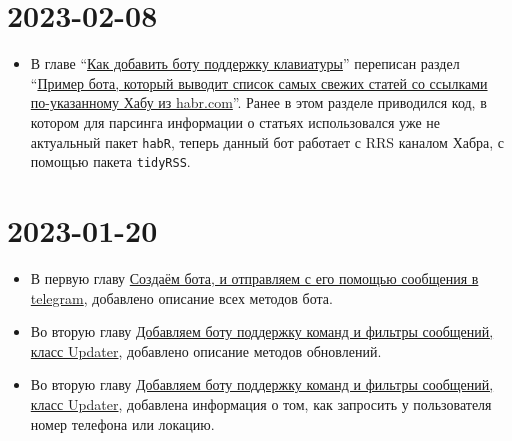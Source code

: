 \documentclass[
]{book}
\providecommand{\tightlist}{%
  \setlength{\itemsep}{0pt}\setlength{\parskip}{0pt}}
\begin{document}
\section*{2023-02-08}\label{section-3}

\begin{itemize}
\tightlist
\item
  В главе ``\hyperref[ux43aux430ux43a-ux434ux43eux431ux430ux432ux438ux442ux44c-ux431ux43eux442ux443-ux43fux43eux434ux434ux435ux440ux436ux43aux443-ux43aux43bux430ux432ux438ux430ux442ux443ux440ux44b]{Как добавить боту поддержку клавиатуры}'' переписан раздел ``\hyperref[ux43fux440ux438ux43cux435ux440-ux431ux43eux442ux430-ux43aux43eux442ux43eux440ux44bux439-ux432ux44bux432ux43eux434ux438ux442-ux441ux43fux438ux441ux43eux43a-ux441ux430ux43cux44bux445-ux441ux432ux435ux436ux438ux445-ux441ux442ux430ux442ux435ux439-ux441ux43e-ux441ux441ux44bux43bux43aux430ux43cux438-ux43fux43e-ux443ux43aux430ux437ux430ux43dux43dux43eux43cux443-ux445ux430ux431ux443-ux438ux437-habr.com]{Пример бота, который выводит список самых свежих статей со ссылками по-указанному Хабу из habr.com}''. Ранее в этом разделе приводился код, в котором для парсинга информации о статьях использовался уже не актуальный пакет \texttt{habR}, теперь данный бот работает с RRS каналом Хабра, с помощью пакета \texttt{tidyRSS}.
\end{itemize}

\section*{2023-01-20}\label{section-4}

\begin{itemize}
\tightlist
\item
  В первую главу \hyperref[ux441ux43eux437ux434ux430ux451ux43c-ux431ux43eux442ux430-ux438-ux43eux442ux43fux440ux430ux432ux43bux44fux435ux43c-ux441-ux435ux433ux43e-ux43fux43eux43cux43eux449ux44cux44e-ux441ux43eux43eux431ux449ux435ux43dux438ux44f-ux432-telegram]{Создаём бота, и отправляем с его помощью сообщения в telegram}, добавлено описание всех методов бота.
\item
  Во вторую главу \hyperref[ux434ux43eux431ux430ux432ux43bux44fux435ux43c-ux431ux43eux442ux443-ux43fux43eux434ux434ux435ux440ux436ux43aux443-ux43aux43eux43cux430ux43dux434-ux438-ux444ux438ux43bux44cux442ux440ux44b-ux441ux43eux43eux431ux449ux435ux43dux438ux439-ux43aux43bux430ux441ux441-updater]{Добавляем боту поддержку команд и фильтры сообщений, класс Updater}, добавлено описание методов обновлений.
\item
  Во вторую главу \hyperref[ux434ux43eux431ux430ux432ux43bux44fux435ux43c-ux431ux43eux442ux443-ux43fux43eux434ux434ux435ux440ux436ux43aux443-ux43aux43eux43cux430ux43dux434-ux438-ux444ux438ux43bux44cux442ux440ux44b-ux441ux43eux43eux431ux449ux435ux43dux438ux439-ux43aux43bux430ux441ux441-updater]{Добавляем боту поддержку команд и фильтры сообщений, класс Updater}, добавлена информация о том, как запросить у пользователя номер телефона или локацию.
\end{itemize}
\end{document}
